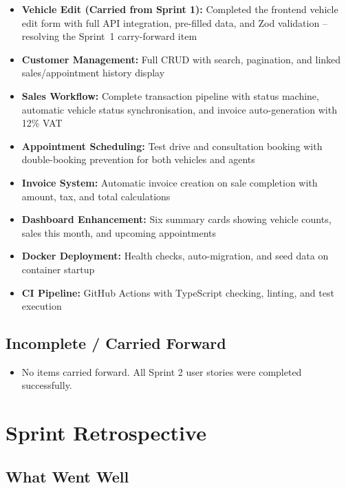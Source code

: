 \documentclass[12pt,a4paper]{article}
\begin{document}
\begin{itemize}[leftmargin=1.5em, itemsep=4pt]
  \item \textbf{Vehicle Edit (Carried from Sprint 1):} Completed the frontend vehicle edit form with full API integration, pre-filled data, and Zod validation -- resolving the Sprint~1 carry-forward item
  \item \textbf{Customer Management:} Full CRUD with search, pagination, and linked sales/appointment history display
  \item \textbf{Sales Workflow:} Complete transaction pipeline with status machine, automatic vehicle status synchronisation, and invoice auto-generation with 12\% VAT
  \item \textbf{Appointment Scheduling:} Test drive and consultation booking with double-booking prevention for both vehicles and agents
  \item \textbf{Invoice System:} Automatic invoice creation on sale completion with amount, tax, and total calculations
  \item \textbf{Dashboard Enhancement:} Six summary cards showing vehicle counts, sales this month, and upcoming appointments
  \item \textbf{Docker Deployment:} Health checks, auto-migration, and seed data on container startup
  \item \textbf{CI Pipeline:} GitHub Actions with TypeScript checking, linting, and test execution
\end{itemize}

\subsection{Incomplete / Carried Forward}

\begin{itemize}[leftmargin=1.5em, itemsep=4pt]
  \item No items carried forward. All Sprint 2 user stories were completed successfully.
\end{itemize}

\section{Sprint Retrospective}

\subsection{What Went Well}
\end{document}
